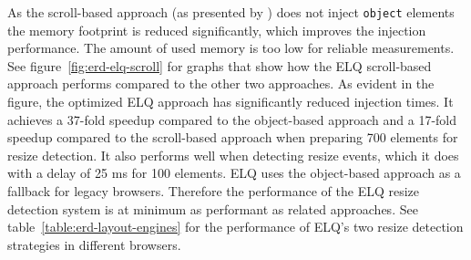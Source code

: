 \documentclass[]{llncs}
\newcommand{\code}[1]{\texttt{#1}}
\newcommand{\elq}{ELQ}
\begin{document}
\begin{figure*}[h]
\begin{center}
\begin{minipage}[t]{.5\textwidth}
        \end{minipage}
      \caption{The left graph shows the injection time of the \elq{} scroll-based approach. The right graph shows all three approaches, including graph predictions by polynomial regression.}
      \label{fig:erd-elq-scroll}
      \end{center}
    \end{figure*}

    \noindent
    As the scroll-based approach (as presented by \cite{backalley}) does not inject \code{object} elements the memory footprint is reduced significantly, which improves the injection performance.
    The amount of used memory is too low for reliable measurements.
    See figure~\ref{fig:erd-elq-scroll} for graphs that show how the \elq{} scroll-based approach performs compared to the other two approaches.
    As evident in the figure, the optimized \elq{} approach has significantly reduced injection times.
    It achieves a 37-fold speedup compared to the object-based approach and a 17-fold speedup compared to the scroll-based approach when preparing 700 elements for resize detection.
    It also performs well when detecting resize events, which it does with a delay of 25 ms for 100 elements.
    \newline\indent
    \elq{} uses the object-based approach as a fallback for legacy browsers.
    Therefore the performance of the \elq{} resize detection system is at minimum as performant as related approaches.
    See table~\ref{table:erd-layout-engines} for the performance of \elq{}'s two resize detection strategies in different browsers.
\end{document}
